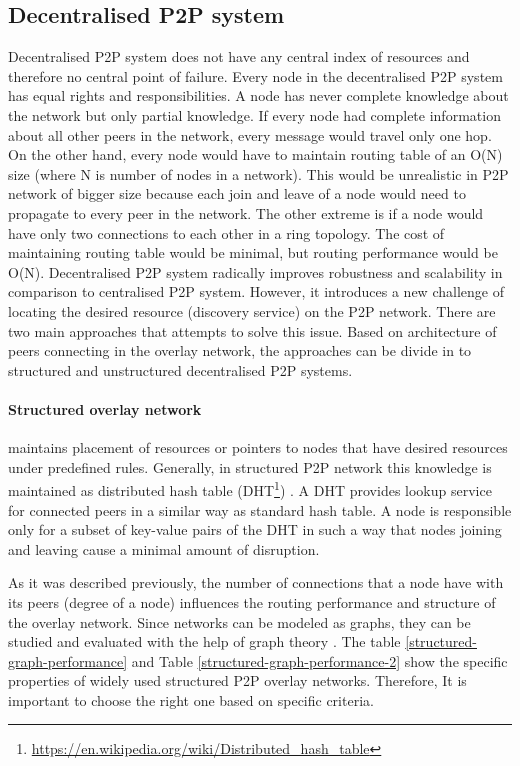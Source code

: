 \subsection{Decentralised P2P system}
\quad Decentralised P2P system does not have any central index of resources and therefore no central point of failure. Every node in the decentralised P2P system has equal rights and responsibilities. A node has never complete knowledge about the network but only partial knowledge. If every node had complete information about all other peers in the network, every message would travel only one hop. On the other hand, every node would have to maintain routing table of an O(N) size (where N is number of nodes in a network). This would be unrealistic in P2P network of bigger size because each join and leave of a node would need to propagate to every peer in the network. The other extreme is if a node would have only two connections to each other in a ring topology. The cost of maintaining routing table would be minimal, but routing performance would be O(N). Decentralised P2P system radically improves robustness and scalability in comparison to centralised P2P system. However, it introduces a new challenge of locating the desired resource (discovery service) on the P2P network. There are two main approaches that attempts to solve this issue. Based on architecture of peers connecting in the overlay network, the approaches can be divide in to structured and unstructured decentralised P2P systems. \cite{koegel_buford_p2p_2009}

\paragraph{Structured overlay network} maintains placement of resources or pointers to nodes that have desired resources under predefined rules. Generally, in structured P2P network this knowledge is maintained as distributed hash table (DHT\footnote{\url{https://en.wikipedia.org/wiki/Distributed_hash_table}}) \cite{korzun_structured_2013}. A DHT provides lookup service for connected peers in a similar way as standard hash table. A node is responsible only for a subset of key-value pairs of the DHT in such a way that nodes joining and leaving cause a minimal amount of disruption.

As it was described previously, the number of connections that a node have with its peers (degree of a node) influences the routing performance and structure of the overlay network. Since networks can be modeled as graphs, they can be studied and evaluated with the help of graph theory \cite{loguinov_graph-theoretic_2003}. The table \ref{structured-graph-performance} and Table \ref{structured-graph-performance-2} show the specific properties of widely used structured P2P overlay networks. Therefore, It is important to choose the right one based on specific criteria.

